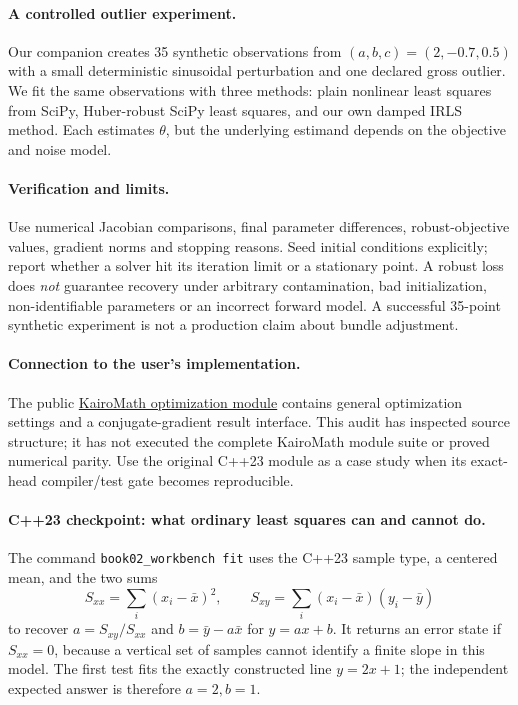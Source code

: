 \paragraph{A controlled outlier experiment.}
Our companion creates 35 synthetic observations from
\((a,b,c)=(2,-0.7,0.5)\) with a small deterministic sinusoidal
perturbation and one declared gross outlier. We fit the same
observations with three methods: plain nonlinear least squares
from SciPy, Huber-robust SciPy least squares, and our own
damped IRLS method. Each estimates \(\theta\), but the
underlying estimand depends on the objective and noise model.

\paragraph{Verification and limits.}
Use numerical Jacobian comparisons, final parameter differences,
robust-objective values, gradient norms and stopping reasons.
Seed initial conditions explicitly; report whether a solver hit
its iteration limit or a stationary point. A robust loss does
\emph{not} guarantee recovery under arbitrary contamination,
bad initialization, non-identifiable parameters or an incorrect
forward model. A successful 35-point synthetic experiment
is not a production claim about bundle adjustment.

\paragraph{Connection to the user's implementation.}
The public \href{https://github.com/swayam8624/KairoMath/blob/master/Optimization.cppm}
{KairoMath optimization module} contains general optimization
settings and a conjugate-gradient result interface. This audit
has inspected source structure; it has not executed the
complete KairoMath module suite or proved numerical parity.
Use the original C++23 module as a case study when its
exact-head compiler/test gate becomes reproducible.


\begin{booktwolab}
\paragraph{C++23 checkpoint: what ordinary least squares can and cannot do.}
The command \texttt{book02\_workbench fit} uses the C++23 sample type,
a centered mean, and the two sums
\[
 S_{xx}=\sum_i(x_i-\bar{x})^2,\qquad
 S_{xy}=\sum_i(x_i-\bar{x})(y_i-\bar{y})
\]
to recover \(a=S_{xy}/S_{xx}\) and \(b=\bar{y}-a\bar{x}\) for
\(y=ax+b\). It returns an error state if \(S_{xx}=0\), because a
vertical set of samples cannot identify a finite slope in this model.
The first test fits the exactly constructed line \(y=2x+1\);
the independent expected answer is therefore \(a=2,b=1\).

\end{booktwolab}

